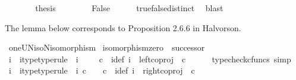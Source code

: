 \begin{isabellebody}
\ \ \ \ \isamarkupfalse%
\ \isamarkupfalse%
\ {\isacharquery}{\kern0pt}thesis\isacommand{{\isachardot}{\kern0pt}}\isamarkupfalse%
\isanewline
\ \ \isamarkupfalse%
\isanewline
\ \ \isamarkupfalse%
\ \isamarkupfalse%
\ False\isanewline
\ \ \ \ \isamarkupfalse%
\ true{\isacharunderscore}{\kern0pt}false{\isacharunderscore}{\kern0pt}distinct\ \isamarkupfalse%
\ blast\isanewline
{}\isamarkupfalse%
%
\endisatagproof
{\isafoldproof}%
%
\isadelimproof
%
\endisadelimproof
%
\begin{isamarkuptext}%
The lemma below corresponds to Proposition 2.6.6 in Halvorson.%
\end{isamarkuptext}\isamarkuptrue%
\isamarkupfalse%
\ oneUN{\isacharunderscore}{\kern0pt}iso{\isacharunderscore}{\kern0pt}N{\isacharunderscore}{\kern0pt}isomorphism{\isacharcolon}{\kern0pt}\isanewline
\ {\isachardoublequoteopen}isomorphism{\isacharparenleft}{\kern0pt}zero\ {\isasymamalg}\ successor{\isacharparenright}{\kern0pt}{\isachardoublequoteclose}\ \isanewline
%
\isadelimproof
%
\endisadelimproof
%
\isatagproof
{}\isamarkupfalse%
\ {\isacharminus}{\kern0pt}\ \isanewline
\ \ \isamarkupfalse%
\ i{}\ \ i{}{\isacharunderscore}{\kern0pt}type{\isacharbrackleft}{\kern0pt}type{\isacharunderscore}{\kern0pt}rule{\isacharbrackright}{\kern0pt}{\isacharcolon}{\kern0pt}\ \ {\isachardoublequoteopen}i{}{\isacharcolon}{\kern0pt}\ {\isasymone}\ {\isasymrightarrow}\ {\isacharparenleft}{\kern0pt}{\isasymone}\ {\isasymCoprod}\ {\isasymnat}\isactrlsub c{\isacharparenright}{\kern0pt}{\isachardoublequoteclose}\ \ i{}{\isacharunderscore}{\kern0pt}def{\isacharcolon}{\kern0pt}\ {\isachardoublequoteopen}i{}\ {\isacharequal}{\kern0pt}\ left{\isacharunderscore}{\kern0pt}coproj\ {\isasymone}\ {\isasymnat}\isactrlsub c{\isachardoublequoteclose}\isanewline
\ \ \ \ \isamarkupfalse%
\ {\isacharparenleft}{\kern0pt}typecheck{\isacharunderscore}{\kern0pt}cfuncs{\isacharcomma}{\kern0pt}\ simp{\isacharparenright}{\kern0pt}\isanewline
\ \ \isamarkupfalse%
\ i{}\ \ i{}{\isacharunderscore}{\kern0pt}type{\isacharbrackleft}{\kern0pt}type{\isacharunderscore}{\kern0pt}rule{\isacharbrackright}{\kern0pt}{\isacharcolon}{\kern0pt}\ \ {\isachardoublequoteopen}i{}{\isacharcolon}{\kern0pt}\ {\isasymnat}\isactrlsub c\ {\isasymrightarrow}\ {\isacharparenleft}{\kern0pt}{\isasymone}\ {\isasymCoprod}\ {\isasymnat}\isactrlsub c{\isacharparenright}{\kern0pt}{\isachardoublequoteclose}\ \ i{}{\isacharunderscore}{\kern0pt}def{\isacharcolon}{\kern0pt}\ {\isachardoublequoteopen}i{}\ {\isacharequal}{\kern0pt}\ right{\isacharunderscore}{\kern0pt}coproj\ {\isasymone}\ {\isasymnat}\isactrlsub c{\isachardoublequoteclose}\isanewline

\end{isabellebody}
